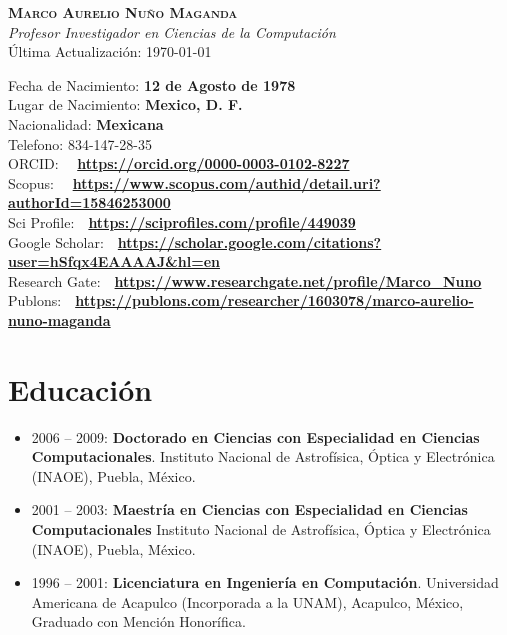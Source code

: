 \documentclass[letterpaper,10pt]{article}
\newcounter{num}
\begin{document}
\begin{center}
    \textbf{\Large \scshape Marco Aurelio Nuño Maganda} \\ \vspace{1pt}
    \textit{Profesor Investigador en Ciencias de la Computación} \\
    Última Actualización: \today \\
\end{center}

\begin{minipage}{0.98 \textwidth} %
Fecha de Nacimiento: \textbf{12 de Agosto de 1978} \\
Lugar de Nacimiento: \textbf{Mexico, D. F.}\\
Nacionalidad: \textbf{Mexicana}\\
Telefono: 834-147-28-35  \\
ORCID: \ \ \textbf{\url{https://orcid.org/0000-0003-0102-8227}} \\
Scopus: \ \ \textbf{\url{https://www.scopus.com/authid/detail.uri?authorId=15846253000}} \\
Sci Profile:\ \ \textbf{\url{https://sciprofiles.com/profile/449039}} \\
Google Scholar:\ \ \textbf{\url{https://scholar.google.com/citations?user=hSfqx4EAAAAJ&hl=en}}\\
Research Gate:\ \ \textbf{\url{https://www.researchgate.net/profile/Marco_Nuno}}\\
Publons:\ \  \textbf{\url{https://publons.com/researcher/1603078/marco-aurelio-nuno-maganda}}\\
\end{minipage}


\section{Educación}
 \begin{itemize}[leftmargin=0.15in, label={}]
\item 2006 -- 2009: \textbf{Doctorado en Ciencias con Especialidad en Ciencias Computacionales}. 
    Instituto Nacional de Astrofísica, Óptica y Electrónica (INAOE), Puebla, México.
%
\item 2001 -- 2003: \textbf{Maestría en Ciencias con Especialidad en Ciencias Computacionales}
    Instituto Nacional de Astrofísica, Óptica y Electrónica (INAOE), Puebla, México. 

\item 1996 -- 2001: \textbf{Licenciatura en Ingeniería en Computación}.
	Universidad Americana de Acapulco (Incorporada a la UNAM), Acapulco, México, Graduado con Mención Honorífica. 
 \end{itemize}
\end{document}
